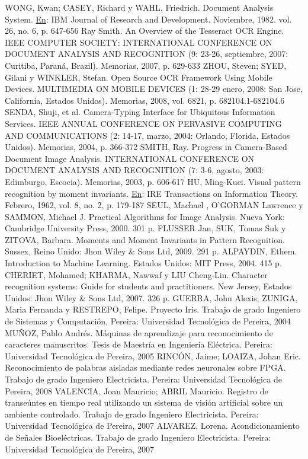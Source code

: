 \documentclass[a4paper, 11pt, oneside]{report}
\begin{document}
WONG, Kwan; CASEY, Richard y WAHL, Friedrich. Document Analysis System. \underline{En}: IBM Journal of Research and Development. Noviembre, 1982. vol. 26, no. 6, p. 647-656
Ray Smith. An Overview of the Tesseract OCR Engine. IEEE COMPUTER SOCIETY: INTERNATIONAL CONFERENCE ON DOCUMENT ANALYSIS AND RECOGNITION (9: 23-26, septiembre, 2007: Curitiba, Paraná, Brazil). Memorias, 2007, p. 629-633
ZHOU, Steven; SYED, Gilani y WINKLER, Stefan. Open Source OCR Framework Using Mobile Devices. MULTIMEDIA ON MOBILE DEVICES (1: 28-29 enero, 2008: San Jose, California, Estados Unidos). Memorias, 2008, vol. 6821, p. 682104.1-682104.6
SENDA, Shuji, et al. Camera-Typing Interface for Ubiquitous Information Services. IEEE ANNUAL CONFERENCE ON PERVASIVE COMPUTING AND COMMUNICATIONS (2: 14-17, marzo, 2004: Orlando, Florida, Estados Unidos). Memorias, 2004, p. 366-372
SMITH, Ray. Progress in Camera-Based Document Image Analysis. INTERNATIONAL CONFERENCE ON DOCUMENT ANALYSIS AND RECOGNITION (7: 3-6, agosto, 2003: Edimburgo, Escocia). Memorias, 2003, p. 606-617
HU, Ming-Kuei. Visual pattern recognition by moment invariants. \underline{En}: IRE Transactions on Information Theory. Febrero, 1962, vol. 8, no. 2, p. 179-187
SEUL, Machael , O'GORMAN Lawrence y SAMMON, Michael J. Practical Algorithms for Image Analysis. Nueva York: Cambridge University Press, 2000. 301 p.
FLUSSER Jan, SUK, Tomas Suk y ZITOVA, Barbara. Moments and Moment Invariants in Pattern Recognition. Sussex, Reino Unido: Jhon Wiley \& Sons Ltd, 2009. 291 p.
ALPAYDIN, Ethem. Introduction to Machine Learning. Estados Unidos: MIT Press, 2004. 415 p.
CHERIET, Mohamed; KHARMA, Nawwaf y LIU Cheng-Lin. Character recognition systems: Guide for students and practitioners. New Jersey, Estados Unidos: Jhon Wiley \& Sons Ltd, 2007. 326 p.
GUERRA, John Alexis; ZUNIGA, Maria Fernanda y RESTREPO, Felipe. Proyecto Iris. Trabajo de grado Ingeniero de Sistemas y Computación, Pereira: Universidad Tecnológica de Pereira, 2004
MUÑOZ, Pablo Andrés. Máquinas de aprendizaje para reconocimiento de caracteres manuscritos. Tesis de Maestría en Ingeniería Eléctrica. Pereira: Universidad Tecnológica de Pereira, 2005
RINCÓN, Jaime; LOAIZA, Johan Eric. Reconocimiento de palabras aisladas mediante redes neuronales sobre FPGA. Trabajo de grado Ingeniero Electricista. Pereira: Universidad Tecnológica de Pereira, 2008
VALENCIA, Joan Mauricio; ABRIL Mauricio. Registro de transeúntes en tiempo real utilizando un sistema de visión artificial sobre un ambiente controlado. Trabajo de grado Ingeniero Electricista. Pereira: Universidad Tecnológica de Pereira, 2007
ALVAREZ, Lorena. Acondicionamiento de Señales Bioeléctricas. Trabajo de grado Ingeniero Electricista. Pereira: Universidad Tecnológica de Pereira, 2007
\end{document}
